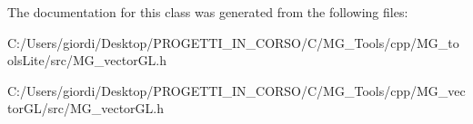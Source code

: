 The documentation for this class was generated from the following files\-:\begin{DoxyCompactItemize}
\item 
C\-:/\-Users/giordi/\-Desktop/\-P\-R\-O\-G\-E\-T\-T\-I\-\_\-\-I\-N\-\_\-\-C\-O\-R\-S\-O/\-C/\-M\-G\-\_\-\-Tools/cpp/\-M\-G\-\_\-tools\-Lite/src/M\-G\-\_\-vector\-G\-L.\-h\item 
C\-:/\-Users/giordi/\-Desktop/\-P\-R\-O\-G\-E\-T\-T\-I\-\_\-\-I\-N\-\_\-\-C\-O\-R\-S\-O/\-C/\-M\-G\-\_\-\-Tools/cpp/\-M\-G\-\_\-vector\-G\-L/src/M\-G\-\_\-vector\-G\-L.\-h\end{DoxyCompactItemize}
